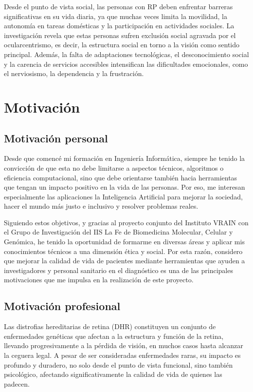 \documentclass[11pt,spanish,listoffigures,listoftables]{tfgetsinf}
\begin{document}
Desde el punto de vista social, las personas con \acs{RP} deben enfrentar barreras significativas en su vida diaria, ya que muchas veces limita la movilidad, la autonomía en tareas domésticas y la participación en actividades sociales. La investigación revela que estas personas sufren exclusión social agravada por el ocularcentrismo, es decir, la estructura social en torno a la visión como sentido principal. Además, la falta de adaptaciones tecnológicas, el desconocimiento social y la carencia de servicios accesibles intensifican las dificultades emocionales, como el nerviosismo, la dependencia y la frustración\cite{DEL}.


\section{Motivación}

\subsection{Motivación personal}
Desde que comencé mi formación en Ingeniería Informática, siempre he tenido la convicción de que esta no debe limitarse a aspectos técnicos, algoritmos o eficiencia computacional, sino que debe orientarse también hacia herramientas que tengan un impacto positivo en la vida de las personas. Por eso, me interesan especialmente las aplicaciones la Inteligencia Artificial para mejorar la sociedad, hacer el mundo más justo e inclusivo y resolver problemas reales.  

Siguiendo estos objetivos, y gracias al proyecto conjunto del Instituto VRAIN con el Grupo de Investigación del \acs{IIS} La Fe de Biomedicina Molecular, Celular y Genómica, he tenido la oportunidad de formarme en diversas áreas y aplicar mis conocimientos técnicos a una dimensión ética y social. Por esta razón, considero que mejorar la calidad de vida de pacientes mediante herramientas que ayuden a investigadores y personal sanitario en el diagnóstico es una de las principales motivaciones que me impulsa en la realización de este proyecto. 

\subsection{Motivación profesional}
Las distrofias hereditarias de retina (\acs{DHR}) constituyen un conjunto de enfermedades genéticas que afectan a la estructura y función de la retina, llevando progresivamente a la pérdida de visión, en muchos casos hasta alcanzar la ceguera legal. A pesar de ser consideradas enfermedades raras, su impacto es profundo y duradero, no solo desde el punto de vista funcional, sino también psicológico, afectando significativamente la calidad de vida de quienes las padecen\cite{STO}.
\end{document}
